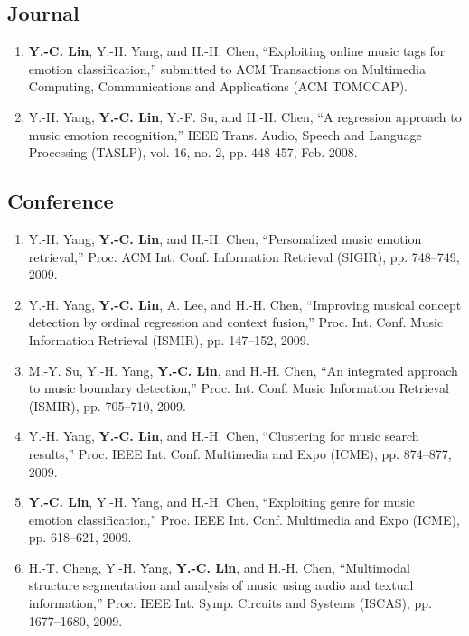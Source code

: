 \documentclass{friggeri-cv}
\begin{document}
\begin{entrylist}
	\subsection{Journal}
		\begin{enumerate}[1.~]
			\item \textbf{Y.-C. Lin}, Y.-H. Yang, and H.-H. Chen, 
				``Exploiting online music tags for emotion classification,''
				submitted to ACM Transactions on Multimedia Computing, Communications and Applications (ACM TOMCCAP).
			\item Y.-H. Yang, \textbf{Y.-C. Lin}, Y.-F. Su, and H.-H. Chen, 
				``A regression approach to music emotion recognition,'' 
				IEEE Trans. Audio, Speech and Language Processing (TASLP), 
				vol. 16, no. 2, pp. 448-457, Feb. 2008.
		\end{enumerate}	
	\subsection{Conference}
		\begin{enumerate}[1.~]
			\item Y.-H. Yang, \textbf{Y.-C. Lin}, and H.-H. Chen, 
				``Personalized music emotion retrieval,'' 
				Proc. ACM Int. Conf. Information Retrieval (SIGIR), 
				pp. 748–749, 2009.
			\item Y.-H. Yang, \textbf{Y.-C. Lin}, A. Lee, and H.-H. Chen, 
				``Improving musical concept detection by ordinal regression and context fusion,'' 
				Proc. Int. Conf. Music Information Retrieval (ISMIR), 
				pp. 147–152, 2009.
			\item M.-Y. Su, Y.-H. Yang, \textbf{Y.-C. Lin}, and H.-H. Chen, 
				``An integrated approach to music boundary detection,'' 
				Proc. Int. Conf. Music Information Retrieval (ISMIR), 
				pp. 705–710, 2009.
			\item Y.-H. Yang, \textbf{Y.-C. Lin}, and H.-H. Chen, 
				``Clustering for music search results,''
				Proc. IEEE Int. Conf. Multimedia and Expo (ICME), 
				pp. 874–877, 2009.
			\item \textbf{Y.-C. Lin}, Y.-H. Yang, and H.-H. Chen, 
				``Exploiting genre for music emotion classification,''
				Proc. IEEE Int. Conf. Multimedia and Expo (ICME), 
				pp. 618–621, 2009.
			\item H.-T. Cheng, Y.-H. Yang, \textbf{Y.-C. Lin}, and H.-H. Chen, 
				``Multimodal structure segmentation and analysis of music using audio and textual information,'' 
				Proc. IEEE Int. Symp. Circuits and Systems (ISCAS), 
				pp. 1677–1680, 2009.

\end{enumerate}
\end{entrylist}
\end{document}

